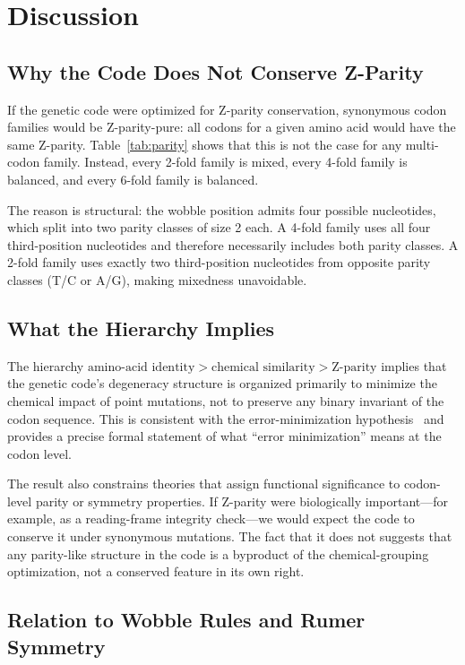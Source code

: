 \documentclass[11pt,twocolumn]{article}
\begin{document}
\section{Discussion}

\subsection{Why the Code Does Not Conserve Z-Parity}

If the genetic code were optimized for Z-parity conservation, synonymous
codon families would be Z-parity-pure: all codons for a given amino acid
would have the same Z-parity. Table~\ref{tab:parity} shows that this is
not the case for any multi-codon family. Instead, every 2-fold family is
mixed, every 4-fold family is balanced, and every 6-fold family is
balanced.

The reason is structural: the wobble position admits four possible
nucleotides, which split into two parity classes of size 2 each. A
4-fold family uses all four third-position nucleotides and therefore
necessarily includes both parity classes. A 2-fold family uses exactly two
third-position nucleotides from opposite parity classes (T/C or A/G),
making mixedness unavoidable.

\subsection{What the Hierarchy Implies}

The hierarchy $\text{amino-acid identity} > \text{chemical similarity} >
\text{Z-parity}$ implies that the genetic code's degeneracy structure is
organized primarily to minimize the chemical impact of point mutations,
not to preserve any binary invariant of the codon sequence. This is
consistent with the error-minimization hypothesis~\cite{HaigHurst1991,
FreelandHurst1998} and provides a precise formal statement of what ``error
minimization'' means at the codon level.

The result also constrains theories that assign functional significance to
codon-level parity or symmetry properties. If Z-parity were biologically
important---for example, as a reading-frame integrity check---we would
expect the code to conserve it under synonymous mutations. The fact that
it does not suggests that any parity-like structure in the code is a
byproduct of the chemical-grouping optimization, not a conserved feature
in its own right.

\subsection{Relation to Wobble Rules and Rumer Symmetry}
\end{document}
